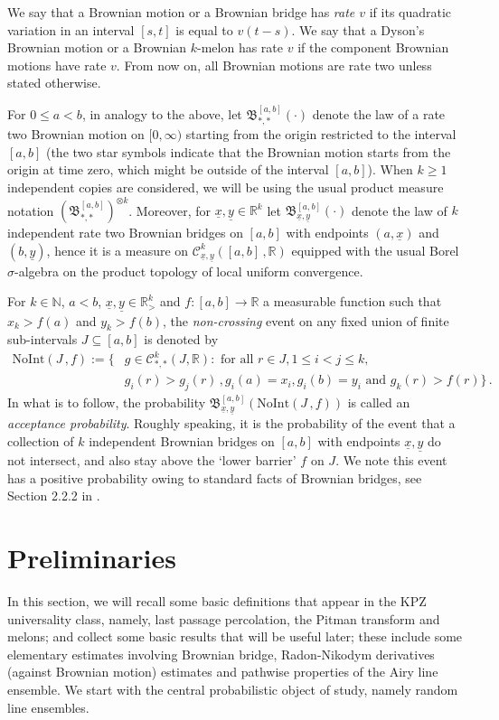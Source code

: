 \documentclass[11pt, reqno]{amsart}
\numberwithin{equation}{section}
\newcommand{\N}{\ensuremath{\mathbb{N}}}
\newcommand{\R}{\ensuremath{\mathbb{R}}}
\begin{document}
We say that a Brownian motion or a Brownian bridge has \emph{rate $v$} if its quadratic variation in an interval $[s,t]$ is equal to $v(t-s)$. We say that a Dyson's Brownian motion or a Brownian $k$-melon has rate $v$ if the component Brownian motions have rate $v$. From now on, all Brownian motions are rate two unless stated otherwise. 

For $0\leq a <b$, in analogy to the above, let $\mathfrak{B}^{[a,b]}_{*, *}(\cdot)$ denote the law of a rate two Brownian motion on $[0,\infty)$ starting from the origin restricted to the interval $[a,b]$ (the two star symbols indicate that the Brownian motion starts from the origin at time zero, which might be outside of the interval $[a,b]$). When $k\ge 1$ independent copies are considered, we will be using the usual product measure notation $(\mathfrak{B}^{[a,b]}_{*, *})^{\otimes k}$. Moreover, for $\underline{x}, \underline{y}\in \R^k$ let $\mathfrak{B}^{[a,b]}_{\underline{x}, \underline{y}}(\cdot)$ denote the law of $k$ independent rate two Brownian bridges on $[a,b]$ with endpoints $(a, \underline{x})$ and $(b, \underline{y})$, hence it is a measure on $\mathscr{C}^k_{\underline{x}, \underline{y}}([a,b]\,, \R)$ equipped with the usual Borel $\sigma$-algebra on the product topology of local uniform convergence. 

For $k\in \N$, $a<b$, $\underline{x},\underline{y}\in \R^k_{>}$ and  $f:[a,b] \to \R$ a measurable function such that $x_{k}>f(a)$ and $y_k>f(b)$, the \emph{non-crossing} event on any fixed union of finite sub-intervals $J \subseteq [a,b]$ is denoted by
\begin{align}\label{eq: noint}
    \mathrm{NoInt}(J\,,f) :=\Big\{&g \in \mathscr{C}^k_{*, *}(J, \R):  \textrm{ for all }   r\in J, 1\leq i<j\leq k, \nonumber \\
     &g_{i}(r) > g_{j}(r)\,, g_i(a)=x_i, g_i(b)=y_i\textrm{ and } g_k(r)>f(r) \Big\}\,.
\end{align} 
In what is to follow, the probability $ \mathfrak{B}^{[a,b]}_{\underline{x},\underline{y}}(\mathrm{NoInt}(J\,,f))$ is called an {\it acceptance probability}. Roughly speaking, it is the probability of the event that a collection of $k$ independent Brownian bridges on $[a,b]$ with endpoints $\underline{x}, \underline{y}$ do not intersect, and also stay above the `lower barrier' $f$ on $J$. We note this event has a positive probability owing to standard facts of Brownian bridges, see Section 2.2.2 in \cite{corwin2014brownian}.

\section{Preliminaries}\label{sec: preliminaries}
In this section, we will recall some basic definitions that appear in the KPZ universality class, namely, last passage percolation, the Pitman transform and melons; and collect some basic results that will be useful later;  these include some elementary estimates involving Brownian bridge, Radon-Nikodym derivatives (against Brownian motion) estimates and pathwise properties of the Airy line ensemble. We start with the central probabilistic object of study, namely random line ensembles.
\end{document}
